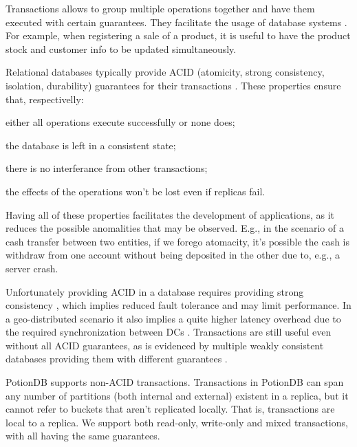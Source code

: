 \documentclass{vldb}
\begin{document}
Transactions allows to group multiple operations together and have them executed with certain guarantees.
They facilitate the usage of database systems \cite{???}.
For example, when registering a sale of a product, it is useful to have the product stock and customer info to be updated simultaneously. %

Relational databases typically provide ACID (atomicity, strong consistency, isolation, durability) guarantees for their transactions \cite{???}.
These properties ensure that, respectivelly:
\begin{enumerate*}[label=(\roman*)]
	\item either all operations execute successfully or none does;
	\item the database is left in a consistent state;
	\item there is no interferance from other transactions;
	\item the effects of the operations won't be lost even if replicas fail.
\end{enumerate*}
Having all of these properties facilitates the development of applications, as it reduces the possible anomalities that may be observed.
E.g., in the scenario of a cash transfer between two entities, if we forego atomacity, it's possible the cash is withdraw from one account without being deposited in the other due to, e.g., a server crash.

Unfortunately providing ACID in a database requires providing strong consistency \cite{???}
, which implies reduced fault tolerance and may limit performance.
In a geo-distributed scenario it also implies a quite higher latency overhead due to the required synchronization between DCs \cite{???}.
Transactions are still useful even without all ACID guarantees, as is evidenced by multiple weakly consistent databases providing them with different guarantees \cite{???}.

PotionDB supports non-ACID transactions.
Transactions in PotionDB can span any number of partitions (both internal and external) existent in a replica, but it cannot refer to buckets that aren't replicated locally.
That is, transactions are local to a replica.
We support both read-only, write-only and mixed transactions, with all having the same guarantees.
\end{document}
